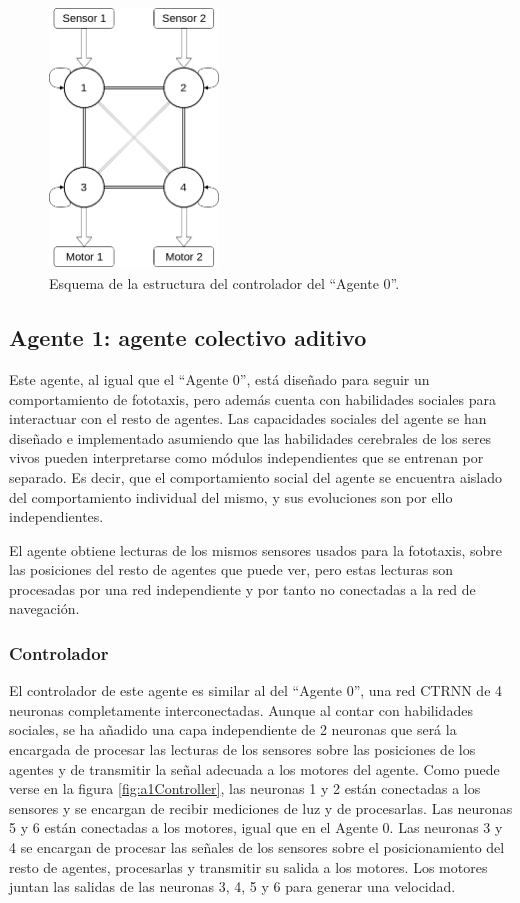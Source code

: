 \begin{figure}[H]
	\centering
	\includegraphics[width=0.4\textwidth,height=7cm]{Imagenes/Agent0Controller}
	\caption{Esquema de la estructura del controlador del ``Agente 0''.}
	\label{fig:a0Controller}
\end{figure}

\subsection{Agente 1: agente colectivo aditivo}
Este agente, al igual que el ``Agente 0'', está diseñado para seguir un comportamiento de fototaxis, pero además cuenta con habilidades sociales para interactuar con el resto de agentes. Las capacidades sociales del agente se han diseñado
e implementado asumiendo que las habilidades cerebrales de los seres vivos pueden interpretarse como módulos independientes que se entrenan por separado. Es decir, que el comportamiento social del agente se encuentra aislado del comportamiento
individual del mismo, y sus evoluciones son por ello independientes.

El agente obtiene lecturas de los mismos sensores usados para la fototaxis, sobre las posiciones del resto de agentes que puede ver, pero estas lecturas son procesadas por una red independiente y por tanto no conectadas a la red de navegación.

\subsubsection{Controlador}
El controlador de este agente es similar al del ``Agente 0'', una red CTRNN de 4 neuronas completamente interconectadas. Aunque al contar con habilidades sociales, se ha añadido una capa independiente de 2 neuronas que será la encargada
de procesar las lecturas de los sensores sobre las posiciones de los agentes y de transmitir la señal adecuada a los motores del agente. Como puede verse en la figura \ref{fig:a1Controller}, las neuronas 1 y 2 están conectadas a los
sensores y se encargan de recibir mediciones de luz y de procesarlas. Las neuronas 5 y 6 están conectadas a los motores, igual que en el Agente 0. Las neuronas 3 y 4 se encargan de procesar las señales de los sensores sobre el posicionamiento
del resto de agentes, procesarlas y transmitir su salida a los motores. Los motores juntan las salidas de las neuronas 3, 4, 5 y 6 para generar una velocidad.

